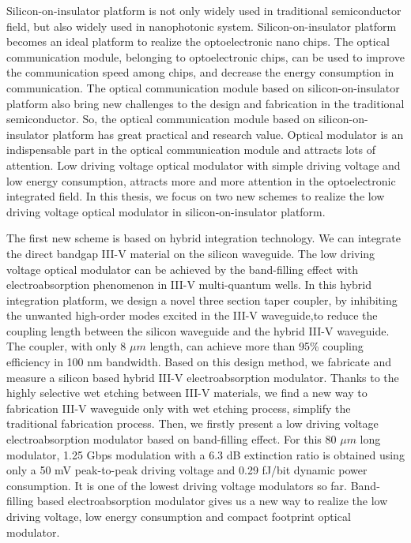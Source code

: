\begin{englishabstract}
Silicon-on-insulator platform is not only widely used in traditional semiconductor field, but also widely used in nanophotonic system. Silicon-on-insulator platform becomes an ideal platform to realize the optoelectronic nano chips. The optical communication module, belonging to optoelectronic chips, can be used to improve the communication speed among chips, and decrease the energy consumption in communication. The optical communication module based on silicon-on-insulator platform also bring new challenges to the design and fabrication in the traditional semiconductor. So, the optical communication module based on silicon-on-insulator platform has great practical and research value. Optical modulator is an indispensable part in the optical communication module and attracts lots of attention. Low driving voltage optical modulator with simple driving voltage and low energy consumption, attracts more and more attention in the optoelectronic integrated field. In this thesis, we focus on two new schemes to realize the low driving voltage optical modulator in silicon-on-insulator platform.

The first new scheme is based on hybrid integration technology. We can integrate the direct bandgap III-V material on the silicon waveguide. The low driving voltage optical modulator can be achieved by the band-filling effect with electroabsorption phenomenon in III-V multi-quantum wells. In this hybrid integration platform, we design a novel three section taper coupler, by inhibiting the unwanted high-order modes excited in the III-V waveguide,to reduce the coupling length between the silicon waveguide and the hybrid III-V waveguide. The coupler, with only 8 $\mu m$ length, can achieve more than 95\% coupling efficiency in 100 nm bandwidth. Based on this design method, we fabricate and measure a silicon based hybrid III-V electroabsorption modulator. Thanks to the highly selective wet etching between III-V materials, we find a new way to fabrication III-V waveguide only with wet etching process, simplify the traditional  fabrication process. Then, we firstly present a low driving voltage electroabsorption modulator based on band-filling effect. For this 80 $\mu m$ long modulator, 1.25 Gbps modulation with a 6.3 dB extinction ratio is obtained using only a 50 mV peak-to-peak driving voltage and 0.29 fJ/bit dynamic power consumption. It is one of the lowest driving voltage modulators so far. Band-filling based electroabsorption modulator gives us a new way to realize the low driving voltage, low energy consumption and compact footprint optical modulator.


\end{englishabstract}
